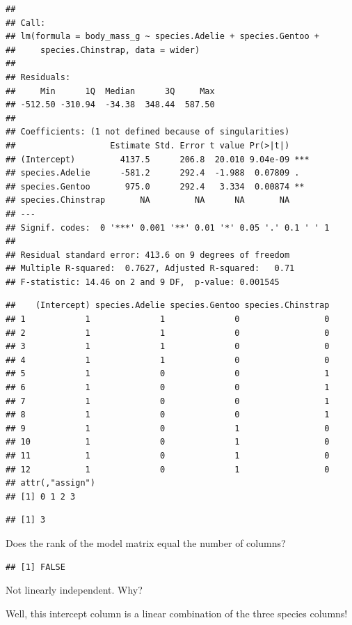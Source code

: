 \documentclass[
  openany]{book}
\begin{document}
\begin{verbatim}
## 
## Call:
## lm(formula = body_mass_g ~ species.Adelie + species.Gentoo + 
##     species.Chinstrap, data = wider)
## 
## Residuals:
##     Min      1Q  Median      3Q     Max 
## -512.50 -310.94  -34.38  348.44  587.50 
## 
## Coefficients: (1 not defined because of singularities)
##                   Estimate Std. Error t value Pr(>|t|)    
## (Intercept)         4137.5      206.8  20.010 9.04e-09 ***
## species.Adelie      -581.2      292.4  -1.988  0.07809 .  
## species.Gentoo       975.0      292.4   3.334  0.00874 ** 
## species.Chinstrap       NA         NA      NA       NA    
## ---
## Signif. codes:  0 '***' 0.001 '**' 0.01 '*' 0.05 '.' 0.1 ' ' 1
## 
## Residual standard error: 413.6 on 9 degrees of freedom
## Multiple R-squared:  0.7627, Adjusted R-squared:   0.71 
## F-statistic: 14.46 on 2 and 9 DF,  p-value: 0.001545
\end{verbatim}

\begin{verbatim}
##    (Intercept) species.Adelie species.Gentoo species.Chinstrap
## 1            1              1              0                 0
## 2            1              1              0                 0
## 3            1              1              0                 0
## 4            1              1              0                 0
## 5            1              0              0                 1
## 6            1              0              0                 1
## 7            1              0              0                 1
## 8            1              0              0                 1
## 9            1              0              1                 0
## 10           1              0              1                 0
## 11           1              0              1                 0
## 12           1              0              1                 0
## attr(,"assign")
## [1] 0 1 2 3
\end{verbatim}

\begin{verbatim}
## [1] 3
\end{verbatim}

Does the rank of the model matrix equal the number of columns?

\begin{verbatim}
## [1] FALSE
\end{verbatim}

Not linearly independent. Why?

Well, this intercept column is a linear combination of the three species columns!
\end{document}
